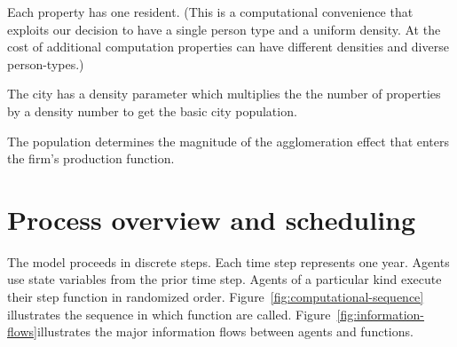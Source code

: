 Each property has one resident. (This is a computational convenience that exploits our decision to have a single person type and a uniform density. At the cost of additional computation properties can have different densities and diverse person-types.) 

The city has a density parameter which multiplies the the number of properties by a density number to get the basic city population. 

The population determines the magnitude of the agglomeration effect that enters the firm's production function.







\section{Process overview and scheduling}

The model proceeds in discrete steps. Each time step represents one year.  Agents use state variables from the prior time step. Agents of a particular kind execute their step function in randomized order.  Figure~\ref{fig:computational-sequence} illustrates the sequence in which function are called. Figure~\ref{fig:information-flows}illustrates the major information flows between agents and functions.

